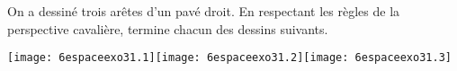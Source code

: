 On a dessiné trois arêtes d'un pavé droit. En respectant les règles de la
perspective cavalière, termine chacun des dessins suivants.
\par
\texttt{[image: 6espaceexo31.1]}\hfill\texttt{[image: 6espaceexo31.2]}\hfill\texttt{[image: 6espaceexo31.3]}
